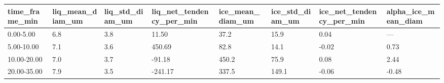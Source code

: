 \begin{tabular}{llllllll}
\toprule
time_frame_min & liq_mean_diam_um & liq_std_diam_um & liq_net_tendency_per_min & ice_mean_diam_um & ice_std_diam_um & ice_net_tendency_per_min & alpha_ice_mean_diam \\
\midrule
0.00-5.00 & 6.8 & 3.8 & 11.50 & 37.2 & 15.9 & 0.04 & — \\
5.00-10.00 & 7.1 & 3.6 & 450.69 & 82.8 & 14.1 & -0.02 & 0.73 \\
10.00-20.00 & 7.0 & 3.7 & -91.18 & 450.2 & 75.9 & 0.08 & 2.44 \\
20.00-35.00 & 7.9 & 3.5 & -241.17 & 337.5 & 149.1 & -0.06 & -0.48 \\
\bottomrule
\end{tabular}
